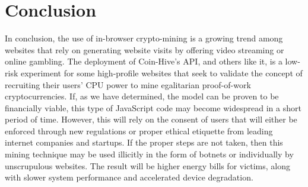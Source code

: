 \section{Conclusion}
In conclusion, the use of in-browser crypto-mining is a growing trend among websites that rely on generating website visits by offering video streaming or online gambling. The deployment of Coin-Hive’s API, and others like it, is a low-risk experiment for some high-profile websites that seek to validate the concept of recruiting their users’ CPU power to mine egalitarian proof-of-work cryptocurrencies. If, as we have determined, the model can be proven to be financially viable, this type of JavaScript code may become widespread in a short period of time. However, this will rely on the consent of users that will either be enforced through new regulations or proper ethical etiquette from leading internet companies and startups. If the proper steps are not taken, then this mining technique may be used illicitly in the form of botnets or individually by unscrupulous websites. The result will be higher energy bills for victims, along with slower system performance and accelerated device degradation.
